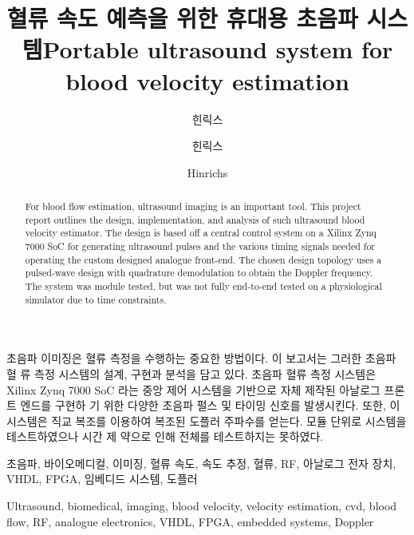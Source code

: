 \documentclass[master,english,final,pdfdoc]{kaist-ucs}
\title[korean] {혈류 속도 예측을 위한 휴대용 초음파 시스템}
\title[english]{Portable ultrasound system for blood velocity estimation}
\author[korean]{힌릭스}{예페}
\author[korean2]{힌릭스}{예페}   %
\author[chinese]{}{}
\author[english]{Hinrichs}{Jeppe}
\begin{document}

	\thesisinfo
	\begin{summary}
		초음파 이미징은 혈류 측정을 수행하는 중요한 방법이다. 이 보고서는 그러한 초음파 혈 류 측정 시스템의 설계, 구현과 분석을 담고 있다. 초음파 혈류 측정 시스템은 Xilinx Zynq	7000 SoC 라는 중앙 제어 시스템을 기반으로 자체 제작된 아날로그 프론트 엔드를 구현하	기 위한 다양한 초음파 펄스 및 타이밍 신호를 발생시킨다. 또한, 이 시스템은 직교 복조를 이용하여 복조된 도플러 주파수를 얻는다. 모듈 단위로 시스템을 테스트하였으나 시간 제 약으로 인해 전체를 테스트하지는 못하였다.
	\end{summary}

	\begin{Korkeyword}
		초음파, 바이오메디컬, 이미징, 혈류 속도, 속도 추정, 혈류, RF, 아날로그 전자 장치, VHDL, FPGA, 임베디드 시스템, 도플러
	\end{Korkeyword}


	\begin{abstract}
		For blood flow estimation, ultrasound imaging is an important tool. This project report outlines the design, implementation, and analysis of such ultrasound blood velocity estimator. The design is based off a central control system on a Xilinx Zynq 7000 SoC for generating ultrasound pulses and the various timing signals needed for operating the custom designed analogue front-end. The chosen design topology uses a pulsed-wave design with quadrature demodulation to obtain the Doppler frequency. The system was module tested, but was not fully end-to-end tested on a physiological simulator due to time constraints.
	\end{abstract}

	\begin{Engkeyword}
		Ultrasound, biomedical, imaging, blood velocity, velocity estimation, cvd, blood flow, RF, analogue electronics, VHDL, FPGA, embedded systems, Doppler
	\end{Engkeyword}


	\addtocounter{pagemarker}{1}                 %
	\newpage
\end{document}
